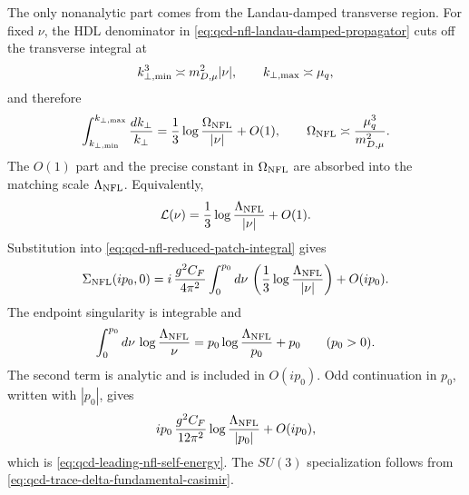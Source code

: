 The only nonanalytic part comes from the Landau-damped transverse region.
For fixed \(\nu\), the HDL denominator in
\eqref{eq:qcd-nfl-landau-damped-propagator} cuts off the transverse integral
at
\[
  k_{\perp,{\rm min}}^3\asymp m_{D,\mu}^2|\nu|,
  \qquad
  k_{\perp,{\rm max}}\asymp\mu_q ,
\]
and therefore
\begin{equation}
  \int_{k_{\perp,{\rm min}}}^{k_{\perp,{\rm max}}}
  \frac{dk_\perp}{k_\perp}
  =
  \frac13\log\frac{\Omega_{\rm NFL}}{|\nu|}
  +O(1),
  \qquad
  \Omega_{\rm NFL}\asymp\frac{\mu_q^3}{m_{D,\mu}^2}.
  \label{eq:qcd-nfl-collinear-log}
\end{equation}
The \(O(1)\) part and the precise constant in \(\Omega_{\rm NFL}\) are
absorbed into the matching scale \(\Lambda_{\rm NFL}\).  Equivalently,
\begin{equation}
  \mathcal L(\nu)
  =
  \frac13\log\frac{\Lambda_{\rm NFL}}{|\nu|}
  +O(1).
  \label{eq:qcd-nfl-transverse-log-function}
\end{equation}
Substitution into \eqref{eq:qcd-nfl-reduced-patch-integral} gives
\begin{equation}
  \Sigma_{\rm NFL}(ip_0,0)
  =
  i\,\frac{g^2C_F}{4\pi^2}
  \int_0^{p_0}d\nu\,
  \left(
    \frac13\log\frac{\Lambda_{\rm NFL}}{|\nu|}
  \right)
  +O(ip_0).
  \label{eq:qcd-nfl-reduced-energy-integral}
\end{equation}
The endpoint singularity is integrable and
\[
  \int_0^{p_0}d\nu\,
  \log\frac{\Lambda_{\rm NFL}}{\nu}
  =
  p_0\log\frac{\Lambda_{\rm NFL}}{p_0}
  +p_0
  \qquad (p_0>0).
\]
The second term is analytic and is included in \(O(ip_0)\).  Odd continuation
in \(p_0\), written with \(|p_0|\), gives
\[
  ip_0\,\frac{g^2C_F}{12\pi^2}
  \log\frac{\Lambda_{\rm NFL}}{|p_0|}
  +O(ip_0),
  \]
which is \eqref{eq:qcd-leading-nfl-self-energy}.  The \(SU(3)\)
specialization follows from \eqref{eq:qcd-trace-delta-fundamental-casimir}.

